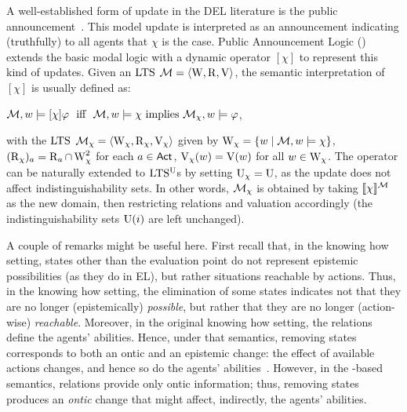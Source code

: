 

A well-established form of update in the DEL literature is the public announcement~\cite{Plaza89:lopc,DELbook}. This model update is interpreted as an announcement indicating (truthfully) to all agents that $\chi$ is the case.
Public Announcement Logic (\PAL) extends the basic modal logic with a dynamic operator $[\chi]$ to represent this kind of updates. Given an $\textup{LTS}$ $\mathcal{M}=\langle \operatorname{W},\operatorname{R},\operatorname{V} \rangle$, the semantic interpretation of $[\chi]$ is usually defined as:
\begin{spcenter}
  $\modults,w\models[\chi]\varphi \ \ \text{iff} \ \  \modults,w\models\chi \mbox{ implies } \modults_{\chi},w\models\varphi$,
\end{spcenter}
with the $\textup{LTS}$ $\mathcal{M}_\chi=\langle \operatorname{W}_\chi,\operatorname{R}_\chi,\operatorname{V}_\chi \rangle$ given by $\operatorname{W}_\chi = \{ w \mid \mathcal{M},w\models\chi \}$, $(\operatorname{R}_\chi)_a = \operatorname{R}_a \cap \operatorname{W}_\chi^2$ for each $a\in{\rm \sf Act}$, $\operatorname{V}_\chi(w) = \operatorname{V}(w)$ for all $w\in\operatorname{W}_\chi$.  The operator can be naturally extended to 
$\textup{LTS$^\text{\textup{U}}$}$s by setting $\operatorname{U}_\chi = {\operatorname{U}}$, as the update does not affect indistinguishability sets. 
In other words, $\mathcal{M}_\chi$ is obtained by taking $\llbracket \chi \rrbracket^{\mathcal{M}}$ as the new domain, then restricting relations and valuation accordingly (the indistinguishability sets $\operatorname{U}(i)$ are left unchanged). 

A couple of remarks might be useful here. First recall that, in the knowing how setting, states other than the evaluation point do not represent epistemic possibilities (as they do in EL), but rather situations reachable by actions. Thus, in the knowing how setting, the elimination of some states indicates not that they are no longer (epistemically) \emph{possible}, but rather that they are no longer (action-wise) \emph{reachable}. Moreover, in the original knowing how setting, the relations define the agents' abilities. Hence, under that semantics, removing states corresponds to both an ontic and an epistemic change: the effect of available actions changes, and hence so do the agents' abilities~\cite{Wang2016}. However, in the \ults-based semantics, relations provide only ontic information; thus, removing states produces an \emph{ontic} change that might affect, indirectly, the agents' abilities.

